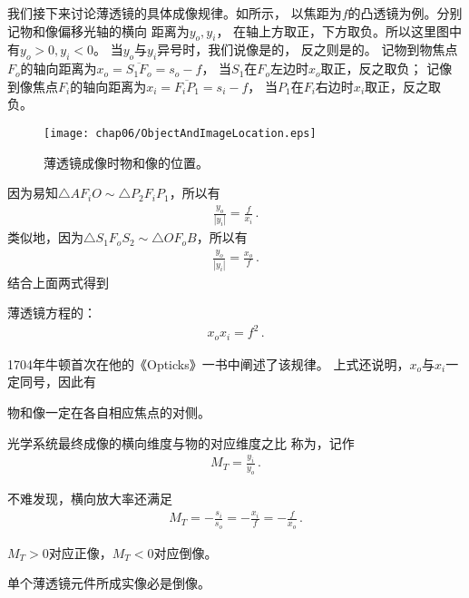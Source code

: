 我们接下来讨论薄透镜的具体成像规律。如所示，
以焦距为$f$的凸透镜为例。分别记物和像偏移光轴的横向
距离为$y_o, y_i$，
在轴上方取正，下方取负。所以这里图中有$y_o>0, y_i<0$。
当$y_o$与$y_i$异号时，我们说像是的，
反之则是的。
记物到物焦点$F_o$的轴向距离为$x_o=\overline{S_1F_o}=s_o-f$，
当$S_1$在$F_o$左边时$x_o$取正，反之取负；
记像到像焦点$F_i$的轴向距离为$x_i=\overline{F_iP_1}=s_i-f$，
当$P_1$在$F_i$右边时$x_i$取正，反之取负。
\begin{figure}[htbp]
    \centering\texttt{[image: chap06/ObjectAndImageLocation.eps]}
    \caption{薄透镜成像时物和像的位置。}
    \label{fig:6.39}
\end{figure}

因为易知$\triangle AF_iO\sim\triangle P_2F_iP_1$，所以有
\begin{align}
    \frac{y_o}{|y_i|}=\frac{f}{x_i}\, .
\end{align}
类似地，因为$\triangle S_1F_oS_2\sim\triangle OF_oB$，所以有
\begin{align}
    \frac{y_o}{|y_i|}=\frac{x_o}{f}\, .
\end{align}
结合上面两式得到
\begin{proposition}
    薄透镜方程的：
    \begin{align}
        x_ox_i=f^2\, .
    \end{align}
\end{proposition}
1704年牛顿首次在他的《Opticks》一书中阐述了该规律。
上式还说明，$x_o$与$x_i$一定同号，因此有
\begin{corollary}
    物和像一定在各自相应焦点的对侧。
\end{corollary}

\begin{definition}
    光学系统最终成像的横向维度与物的对应维度之比
    称为，记作
    \begin{align}
        M_T=\frac{y_i}{y_o}\, .
    \end{align}
\end{definition}
不难发现，横向放大率还满足
\begin{align}
    M_T=-\frac{s_i}{s_o}=-\frac{x_i}{f}=-\frac{f}{x_o}\, .
\end{align}

\begin{corollary}
    $M_T>0$对应正像，$M_T<0$对应倒像。
\end{corollary}
\begin{corollary}
    单个薄透镜元件所成实像必是倒像。
\end{corollary}

